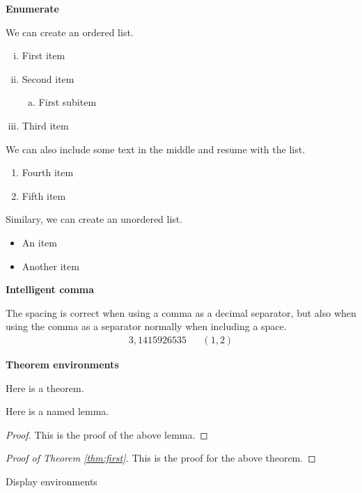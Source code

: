 \documentclass{myassignment}
\begin{document}
\textbf{Enumerate}

We can create an ordered list.

\begin{enumerate}[i.]
    \item First item
    \item Second item
    \begin{enumerate}[(a)]
        \item First subitem
    \end{enumerate}
    \item Third item
\end{enumerate}

We can also include some text in the middle and resume with the list.

\begin{enumerate}[resume*]
    \item Fourth item
    \item Fifth item
\end{enumerate}

Similary, we can create an unordered list.

\begin{itemize}
    \item An item
    \item Another item
\end{itemize}

\textbf{Intelligent comma}

The spacing is correct when using a comma as a decimal separator, but also when using the comma as a separator normally when including a space.
\begin{align*}
    3,1415926535 && (1, 2)
\end{align*}

\textbf{Theorem environments}

\begin{theorem}\label{thm:first}
Here is a theorem.
\end{theorem}

\begin{lemma}\label{lem:second}
Here is a named lemma.
\end{lemma}

\begin{proof}
This is the proof of the above lemma.
\end{proof}

\begin{proof}[Proof of Theorem \ref{thm:first}]
This is the proof for the above theorem.
\end{proof}

Display environments



\end{document}

